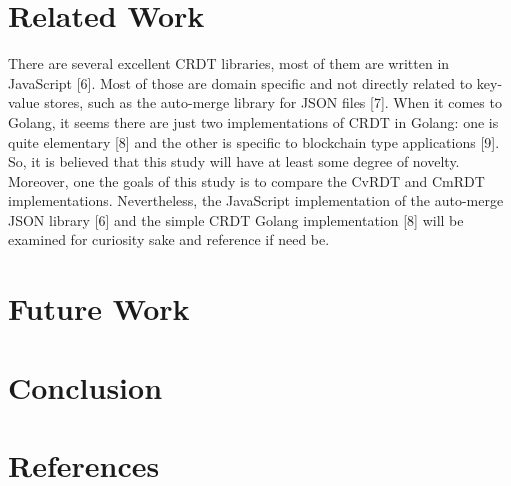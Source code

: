 \documentclass[11pt]{article}
\begin{document}
\newpage
\section{Related Work}
There are several excellent CRDT libraries, most of them are written in JavaScript [6]. Most of those are domain specific and not directly related to key-value stores, such as the auto-merge library for JSON files [7]. When it comes to Golang, it seems there are just two implementations of CRDT in Golang: one is quite elementary [8] and the other is specific to blockchain type applications [9]. So, it is believed that this study will have at least some degree of novelty. Moreover, one the goals of this study is to compare the CvRDT and CmRDT implementations. Nevertheless, the JavaScript implementation of the auto-merge JSON library [6] and the simple CRDT Golang implementation [8] will be examined for curiosity sake and reference if need be.

\newpage
\section{Future Work}

\newpage
\section{Conclusion}

\newpage
\section*{References}
\end{document}
